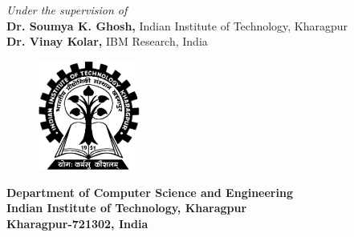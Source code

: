 \begin{center}
\vspace*{4mm}\fontsize{14pt}{16.8pt}\selectfont\textit{Under the supervision of} \\
\vspace*{2mm}\fontsize{14pt}{16.8pt}\selectfont\textbf{Dr. Soumya K. Ghosh,} Indian Institute of Technology, Kharagpur   \\ \textbf{Dr. Vinay Kolar,}  IBM Research, India \\
\vspace*{8mm}
\begin{figure}[!ht]
\centering
\includegraphics[height=36.068mm,width=33.274mm]{figs/iitlogo.eps}
\end{figure}
\vspace*{3mm}
\fontsize{14pt}{16.8pt}\selectfont\textbf{Department of Computer Science and Engineering \\
\vspace*{2mm} Indian Institute of Technology, Kharagpur} \\
\vspace*{2mm}
\fontsize{14pt}{16.8pt}\selectfont\textbf{Kharagpur-721302, India}
\end{center}
